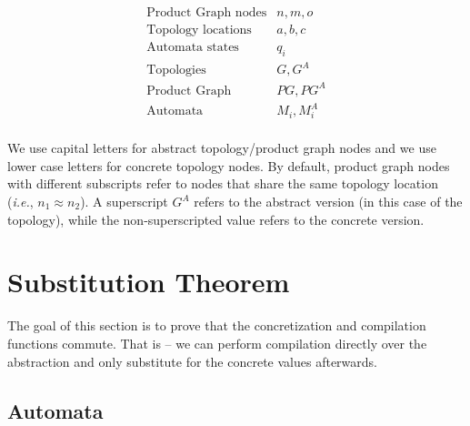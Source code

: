 \documentclass[twocolumn]{sig-alternate-10pt}
\newcommand{\IE}{\emph{i.e.}}
\begin{document}
\[ \begin{array}{ll}
  \text{Product Graph nodes} & n,m,o \\
  \text{Topology locations} & a,b,c \\
  \text{Automata states} & q_i \\
  \text{Topologies} & G, G^A \\
  \text{Product Graph} & PG, PG^A \\
  \text{Automata} & M_i, M_i^A \\
\end{array} \]

We use capital letters for abstract topology/product graph nodes and we use lower case letters for concrete topology nodes. By default, product graph nodes with different subscripts refer to nodes that share the same topology location (\IE, $n_1 \approx n_2$). A superscript $G^A$ refers to the abstract version (in this case of the topology), while the non-superscripted value refers to the concrete version.


\section{Substitution Theorem}

The goal of this section is to prove that the concretization and compilation functions commute. That is -- we can perform compilation directly over the abstraction and only substitute for the concrete values afterwards.

\subsection{Automata}

\newcommand{\Lang}{\ensuremath{\mathcal{L}}}
\end{document}
